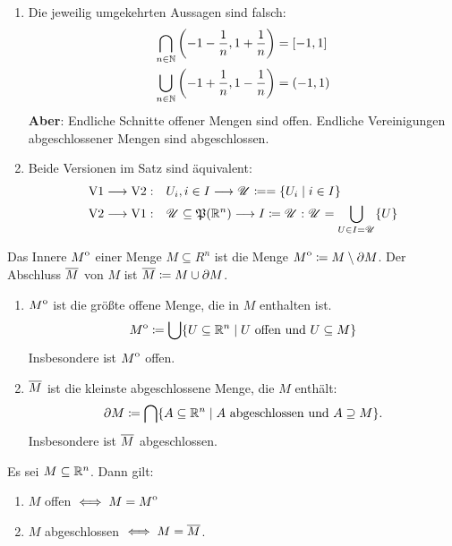 \begin{bem}
    \begin{enumerate}
        \item Die jeweilig umgekehrten Aussagen sind falsch:
        \begin{align*}
            \bigcap_{n\in\mathbb{N}} \left(-1-\frac{1}{n},1+\frac{1}{n}\right) &= [-1,1]\\
            \bigcup_{n\in\mathbb{N}} \left(-1+\frac{1}{n},1-\frac{1}{n}\right) &= (-1,1)
        \end{align*}
        \textbf{Aber}: Endliche Schnitte offener Mengen sind offen. Endliche Vereinigungen abgeschlossener Mengen sind abgeschlossen.
        \item Beide Versionen im Satz sind äquivalent:
        \begin{align*}
            \mathrm{V1} \longrightarrow \mathrm{V2}:\quad& U_i, i\in I \longrightarrow \mathscr{U} \coloneqq = \{U_i \mid i\in I\}\\
            \mathrm{V2} \longrightarrow \mathrm{V1}:\quad& \mathscr{U}\subseteq \mathfrak{P}(\mathbb{R}^n) \longrightarrow I \coloneqq \mathscr{U}: \mathscr{U} = \bigcup_{U\in I=\mathscr{U}}\{U\}
        \end{align*}
    \end{enumerate}
\end{bem}
\begin{defn}
    Das Innere ${\kern0ptM}^{\mathrm{o}}$ einer Menge $M\subseteq R^n$ ist die Menge ${\kern0ptM}^{\mathrm{o}} \coloneqq M \setminus \partial M$. Der Abschluss ${\overline{\kern0ptM}}$ von $M$ ist ${\overline{\kern0ptM}}\coloneqq M\cup \partial M$.
\end{defn}
\begin{lemma}
    \begin{enumerate}
        \item ${\kern0ptM}^{\mathrm{o}}$ ist die größte offene Menge, die in $M$ enthalten ist.
        \[
            {\kern0ptM}^{\mathrm{o}} \coloneqq \bigcup \{U\subseteq \mathbb{R}^n \mid U\mathrm{\ offen\ und\ } U\subseteq M\}
        \]
        Insbesondere ist ${\kern0ptM}^{\mathrm{o}}$ offen.
        \item ${\overline{\kern0ptM}}$ ist die kleinste abgeschlossene Menge, die $M$ enthält:
        \[
            \partial{M} \coloneqq \bigcap \{A\subseteq \mathbb{R}^n \mid A\mathrm{\ abgeschlossen\ und\ } A\supseteq M\}.
        \]
        Insbesondere ist ${\overline{\kern0ptM}}$ abgeschlossen.
    \end{enumerate}
\end{lemma}
\begin{kor}
    Es sei $M\subseteq \mathbb{R}^n$. Dann gilt:
    \begin{enumerate}
        \item $M$ offen $\iff M = {\kern0ptM}^{\mathrm{o}}$
        \item $M$ abgeschlossen $\iff M = {\overline{\kern0ptM}}$.
    \end{enumerate}
\end{kor}

